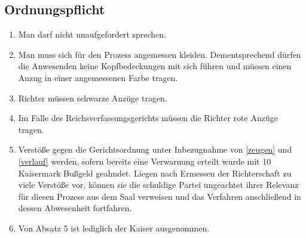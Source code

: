 \documentclass{article}
\begin{document}
\subsection{Ordnungspflicht}\label{gordnung}
\begin{enumerate}[(1)]
    \item Man darf nicht unaufgefordert sprechen.
    \item Man muss sich für den Prozess angemessen kleiden. Dementsprechend dürfen die Anwesenden keine Kopfbedeckungen mit sich führen und müssen einen Anzug in einer angemessenen Farbe tragen.
    \item Richter müssen schwarze Anzüge tragen.
    \item Im Falle des Reichsverfassungsgerichts müssen die Richter rote Anzüge tragen.
    \item Verstöße gegen die Gerichtsordnung unter Inbezugnahme von \ref{zeugen} und \ref{verlauf} werden, sofern bereits eine Verwarnung erteilt wurde mit 10 Kaisermark Bußgeld geahndet. Liegen nach Ermessen der Richterschaft zu viele Verstöße vor, können sie die schuldige Partei ungeachtet ihrer Relevanz für diesen Prozess aus dem Saal verweisen und das Verfahren anschließend in dessen Abwesenheit fortfahren.
    \item Von Absatz 5 ist lediglich der Kaiser ausgenommen.
\end{enumerate}
\end{document}
